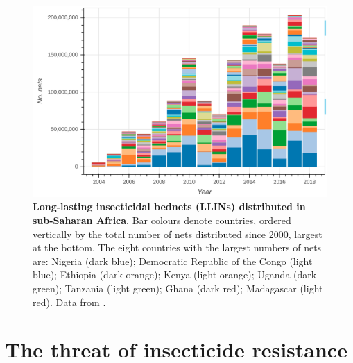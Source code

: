 \begin{refsection}
\begin{figure}[t!]
\begin{center}
\includegraphics*[width=1\linewidth,center]{artwork/chapter1/llins.png}
\end{center}
\caption{
%
\textbf{Long-lasting insecticidal bednets (LLINs) distributed in sub-Saharan Africa}.
%
Bar colours denote countries, ordered vertically by the total number of nets distributed since 2000, largest at the bottom.
%
The eight countries with the largest numbers of nets are: Nigeria (dark blue); Democratic Republic of the Congo (light blue); Ethiopia (dark orange); Kenya (light orange); Uganda (dark green); Tanzania (light green); Ghana (dark red); Madagascar (light red).
%
Data from \textcite{AMP2020}.
%
}
\label{fig:llins}
\end{figure}


\section{The threat of insecticide resistance}\label{sec:insecticide-resistance}



\end{refsection}
